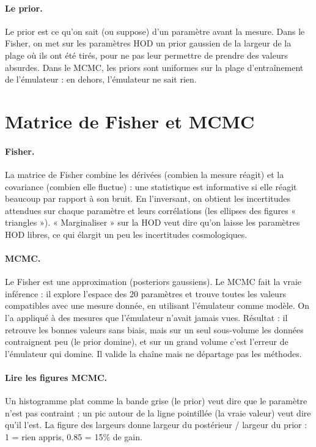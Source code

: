 \documentclass[11pt]{article}
\begin{document}
\paragraph{Le prior.} Le prior est ce qu'on sait (ou suppose) d'un paramètre avant la mesure. Dans le Fisher, on met sur les paramètres HOD un prior gaussien de la largeur de la plage où ils ont été tirés, pour ne pas leur permettre de prendre des valeurs absurdes. Dans le MCMC, les priors sont uniformes sur la plage d'entraînement de l'émulateur : en dehors, l'émulateur ne sait rien.

\section{Matrice de Fisher et MCMC}

\paragraph{Fisher.} La matrice de Fisher combine les dérivées (combien la mesure réagit) et la covariance (combien elle fluctue) : une statistique est informative si elle réagit beaucoup par rapport à son bruit. En l'inversant, on obtient les incertitudes attendues sur chaque paramètre et leurs corrélations (les ellipses des figures « triangles »). « Marginaliser » sur la HOD veut dire qu'on laisse les paramètres HOD libres, ce qui élargit un peu les incertitudes cosmologiques.

\paragraph{MCMC.} Le Fisher est une approximation (posteriors gaussiens). Le MCMC fait la vraie inférence : il explore l'espace des 20 paramètres et trouve toutes les valeurs compatibles avec une mesure donnée, en utilisant l'émulateur comme modèle. On l'a appliqué à des mesures que l'émulateur n'avait jamais vues. Résultat : il retrouve les bonnes valeurs sans biais, mais sur un seul sous-volume les données contraignent peu (le prior domine), et sur un grand volume c'est l'erreur de l'émulateur qui domine. Il valide la chaîne mais ne départage pas les méthodes.

\paragraph{Lire les figures MCMC.} Un histogramme plat comme la bande grise (le prior) veut dire que le paramètre n'est pas contraint ; un pic autour de la ligne pointillée (la vraie valeur) veut dire qu'il l'est. La figure des largeurs donne largeur du postérieur / largeur du prior : 1 = rien appris, 0.85 = 15\% de gain.
\end{document}
